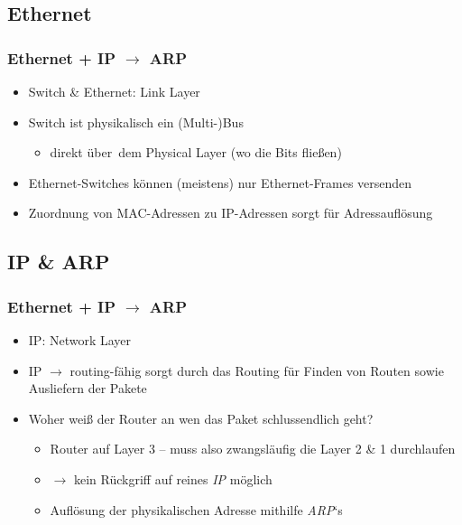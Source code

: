 \documentclass[xcolor=dvipsnames, aspectratio=169]{beamer}
\begin{document}
\subsection{Ethernet}
\begin{frame}
	\frametitle{Ethernet + IP $\rightarrow$ ARP}
	\begin{itemize}
		\item Switch \& Ethernet: Link Layer
		\item Switch ist physikalisch ein (Multi-)Bus
		\begin{itemize}
			\item direkt \glqq über\grqq\ dem Physical Layer (wo die Bits fließen)
		\end{itemize}
		\item Ethernet-Switches können (meistens) nur Ethernet-Frames versenden
		\item Zuordnung von MAC-Adressen zu IP-Adressen sorgt für Adressauflösung
	\end{itemize}
\end{frame}
\subsection{IP \& ARP}
\begin{frame}
	\frametitle{Ethernet + IP $\rightarrow$ ARP}
	\begin{itemize}
		\item IP: Network Layer
		\item IP $\rightarrow$ routing-fähig sorgt durch das Routing für Finden von Routen sowie Ausliefern der Pakete
		\item Woher weiß der Router an wen das Paket schlussendlich geht?
		\begin{itemize}[<+->]
			\item Router auf Layer 3 -- muss also zwangsläufig die Layer 2 \& 1 durchlaufen
			\item $\rightarrow$ kein Rückgriff auf reines \emph{IP} möglich
			\item Auflösung der physikalischen Adresse mithilfe \emph{ARP}`s
		\end{itemize}
	\end{itemize}
\end{frame}
\end{document}
